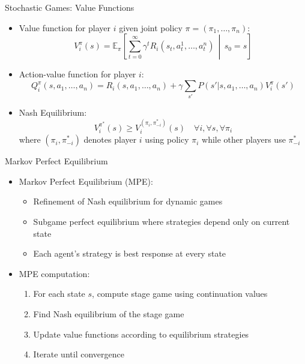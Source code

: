 \documentclass[10pt]{beamer}
\newcommand{\E}{\mathbb{E}}
\begin{document}
\begin{frame}{Stochastic Games: Value Functions}
    \begin{itemize}
        \item Value function for player $i$ given joint policy $\pi = (\pi_1, \ldots, \pi_n)$:
        \begin{equation}
            V_i^{\pi}(s) = \E_{\pi}\left[\sum_{t=0}^{\infty} \gamma^t R_i(s_t, a_t^1, \ldots, a_t^n) \,\middle|\, s_0 = s\right]
        \end{equation}
        
        \item Action-value function for player $i$:
        \begin{equation}
            Q_i^{\pi}(s, a_1, \ldots, a_n) = R_i(s, a_1, \ldots, a_n) + \gamma \sum_{s'} P(s'|s, a_1, \ldots, a_n) V_i^{\pi}(s')
        \end{equation}
        
        \item Nash Equilibrium:
        \begin{equation}
            V_i^{\pi^*}(s) \geq V_i^{(\pi_i, \pi_{-i}^*)}(s) \quad \forall i, \forall s, \forall \pi_i
        \end{equation}
        where $(\pi_i, \pi_{-i}^*)$ denotes player $i$ using policy $\pi_i$ while other players use $\pi_{-i}^*$
    \end{itemize}
\end{frame}


\begin{frame}{Markov Perfect Equilibrium}
    \begin{itemize}
        \item Markov Perfect Equilibrium (MPE):
        \begin{itemize}
            \item Refinement of Nash equilibrium for dynamic games
            \item Subgame perfect equilibrium where strategies depend only on current state
            \item Each agent's strategy is best response at every state
        \end{itemize}
        \vspace{0.2cm}
        \item MPE computation:
        \begin{enumerate}
            \item For each state $s$, compute stage game using continuation values
            \item Find Nash equilibrium of the stage game
            \item Update value functions according to equilibrium strategies
            \item Iterate until convergence
        \end{enumerate}
    \end{itemize}
\end{frame}
\end{document}
